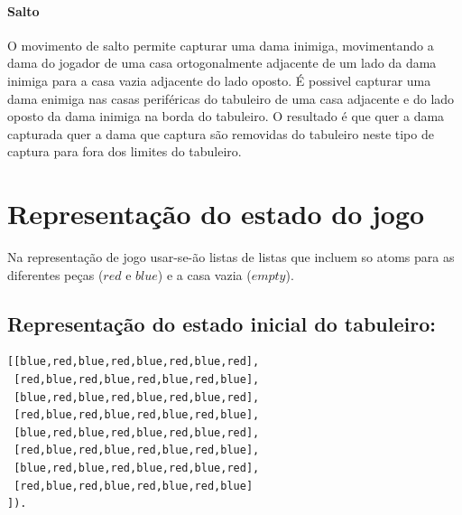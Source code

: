 \documentclass[a4paper,11pt,titlepage]{article}
\begin{document}
\paragraph{Salto}
O movimento de salto permite capturar uma dama inimiga, movimentando a dama do jogador de uma casa ortogonalmente adjacente de um lado da dama inimiga para a casa vazia adjacente do lado oposto. É possivel capturar uma dama enimiga nas casas periféricas do tabuleiro de uma casa adjacente e do lado oposto da dama inimiga na borda do tabuleiro. O resultado é que quer a dama capturada quer a dama que captura são removidas do tabuleiro neste tipo de captura para fora dos limites do tabuleiro.

\section{Representação do estado do jogo}

Na representação de jogo usar-se-ão listas de listas que incluem so 
atoms para as diferentes peças ($red$ e $blue$) e a casa vazia ($empty$).
\subsection{Representação do estado inicial do tabuleiro:}
\begin{verbatim}
[[blue,red,blue,red,blue,red,blue,red],
 [red,blue,red,blue,red,blue,red,blue],
 [blue,red,blue,red,blue,red,blue,red],
 [red,blue,red,blue,red,blue,red,blue],
 [blue,red,blue,red,blue,red,blue,red],
 [red,blue,red,blue,red,blue,red,blue],
 [blue,red,blue,red,blue,red,blue,red],
 [red,blue,red,blue,red,blue,red,blue]
]).
\end{verbatim}
\end{document}
